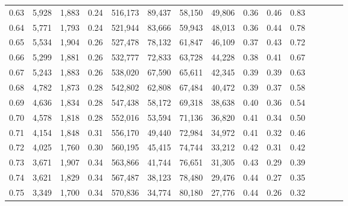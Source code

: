 \begin{tabular}{rrrcrrrrrrrrrrr}
0.63 &   5,928 &  1,883 &                                       0.24 &  516,173 &   89,437 &   58,150 &   49,806 &  0.36 &  0.46 &                         0.83 \\
0.64 &   5,771 &  1,793 &                                       0.24 &  521,944 &   83,666 &   59,943 &   48,013 &  0.36 &  0.44 &                         0.78 \\
0.65 &   5,534 &  1,904 &                                       0.26 &  527,478 &   78,132 &   61,847 &   46,109 &  0.37 &  0.43 &                         0.72 \\
0.66 &   5,299 &  1,881 &                                       0.26 &  532,777 &   72,833 &   63,728 &   44,228 &  0.38 &  0.41 &                         0.67 \\
0.67 &   5,243 &  1,883 &                                       0.26 &  538,020 &   67,590 &   65,611 &   42,345 &  0.39 &  0.39 &                         0.63 \\
0.68 &   4,782 &  1,873 &                                       0.28 &  542,802 &   62,808 &   67,484 &   40,472 &  0.39 &  0.37 &                         0.58 \\
0.69 &   4,636 &  1,834 &                                       0.28 &  547,438 &   58,172 &   69,318 &   38,638 &  0.40 &  0.36 &                         0.54 \\
0.70 &   4,578 &  1,818 &                                       0.28 &  552,016 &   53,594 &   71,136 &   36,820 &  0.41 &  0.34 &                         0.50 \\
0.71 &   4,154 &  1,848 &                                       0.31 &  556,170 &   49,440 &   72,984 &   34,972 &  0.41 &  0.32 &                         0.46 \\
0.72 &   4,025 &  1,760 &                                       0.30 &  560,195 &   45,415 &   74,744 &   33,212 &  0.42 &  0.31 &                         0.42 \\
0.73 &   3,671 &  1,907 &                                       0.34 &  563,866 &   41,744 &   76,651 &   31,305 &  0.43 &  0.29 &                         0.39 \\
0.74 &   3,621 &  1,829 &                                       0.34 &  567,487 &   38,123 &   78,480 &   29,476 &  0.44 &  0.27 &                         0.35 \\
0.75 &   3,349 &  1,700 &                                       0.34 &  570,836 &   34,774 &   80,180 &   27,776 &  0.44 &  0.26 &                         0.32 \\

\end{tabular}
